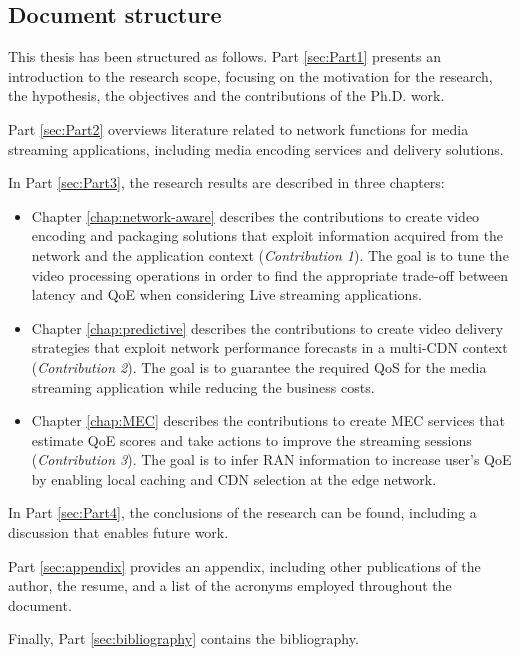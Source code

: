 \subsection{Document structure}

This thesis has been structured as follows. Part \ref{sec:Part1} presents an introduction to the research scope, focusing on the motivation for the research, the hypothesis, the objectives and the contributions of the Ph.D. work. 

Part \ref{sec:Part2} overviews literature related to network functions for media streaming applications, including media encoding services and delivery solutions.

In Part \ref{sec:Part3}, the research results are described in three chapters:

\begin{itemize}
	\item Chapter \ref{chap:network-aware} describes the contributions to create video encoding and packaging solutions that exploit information acquired from the network and the application context (\textit{Contribution 1}). The goal is to tune the video processing operations in order to find the appropriate trade-off between latency and QoE when considering Live streaming applications.
	\item Chapter \ref{chap:predictive} describes the contributions to create video delivery strategies that exploit network performance forecasts in a multi-CDN context (\textit{Contribution 2}). The goal is to guarantee the required QoS for the media streaming application while reducing the business costs.
	\item Chapter \ref{chap:MEC} describes the contributions to create MEC services that estimate QoE scores and take actions to improve the streaming sessions (\textit{Contribution 3}). The goal is to infer RAN information to increase user's QoE by enabling local caching and CDN selection at the edge network.
\end{itemize}

In Part \ref{sec:Part4}, the conclusions of the research can be found, including a discussion that enables future work.

Part \ref{sec:appendix} provides an appendix, including other publications of the author, the resume, and a list of the acronyms employed throughout the document.

Finally, Part \ref{sec:bibliography} contains the bibliography.
